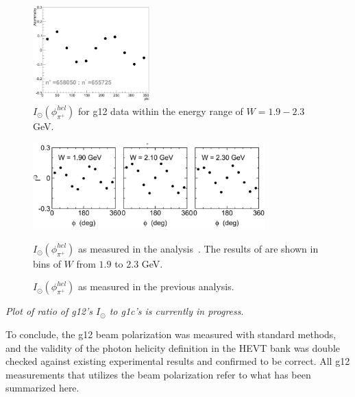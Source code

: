 \begin{figure}[htpb]
\begin{center}
 \includegraphics[width=0.4\textwidth]{figures/calib/pol/myIo.eps}
  \caption{$I_{\odot}(\phi^{hel}_{\pi^+})$ for g12 data within the energy range of $W = 1.9-2.3$ GeV.}
  \label{myIo}
  \end{center}
\end{figure}


\begin{figure}[htpb]
\begin{center}
 \includegraphics[width=0.8\textwidth]{figures/calib/pol/Io.eps}
  \caption{$I_{\odot}(\phi^{hel}_{\pi^+})$ as measured in the previous analysis.}{ $I_{\odot}(\phi^{hel}_{\pi^+})$ as measured in the analysis~\cite{Io}. The results of are shown in bins of $W$ from $1.9$ to 2.3 GeV.}
  \label{Io}
  \end{center}
\end{figure}

\textit{Plot of ratio of g12's $I_{\odot}$ to g1c's is currently in progress}.

To conclude, the g12 beam polarization was measured with standard methods, and the validity of the photon helicity definition in the HEVT bank was double checked against existing experimental results and confirmed to be correct. All g12 measurements that utilizes the beam polarization refer to what has been summarized here.


